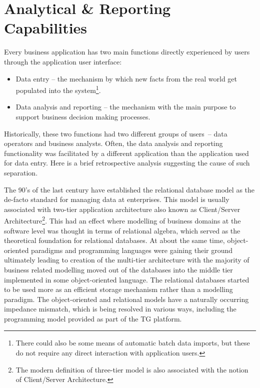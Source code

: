 \section{Analytical \& Reporting Capabilities}\label{sec:06}
  Every business application has two main functions directly experienced by users through the application user interface:
  \begin{itemize}
   \item Data entry -- the mechanism by which new facts from the real world get populated into the system\footnote{There could also be some means of automatic batch data imports, but these do not require any direct interaction with application users.}.
   \item Data analysis and reporting -- the mechanism with the main purpose to support business decision making processes.
  \end{itemize}
  Historically, these two functions had two different groups of users~-- data operators and business analysts.
  Often, the data analysis and reporting functionality was facilitated by a different application than the application used for data entry.
  Here is a brief retrospective analysis suggesting the cause of such separation.
  
  The 90's of the last century have established the relational database model as the de-facto standard for managing data at enterprises.
  This model is usually associated with two-tier application architecture also known as Client/Server Architecture\footnote{The modern definition of three-tier model is also associated with the notion of Client/Server Architecture.}.
  This had an effect where modelling of business domains at the software level was thought in terms of relational algebra, which served as the theoretical foundation for relational databases.
  At about the same time, object-oriented paradigms and programming languages were gaining their ground ultimately leading to creation of the multi-tier architecture with the majority of business related modelling moved out of the databases into the middle tier implemented in some object-oriented language.
  The relational databases started to be used more as an efficient storage mechanism rather than a modelling paradigm.
  The object-oriented and relational models have a naturally occurring impedance mismatch, which is being resolved in various ways, including the programming model provided as part of the TG platform.
  
